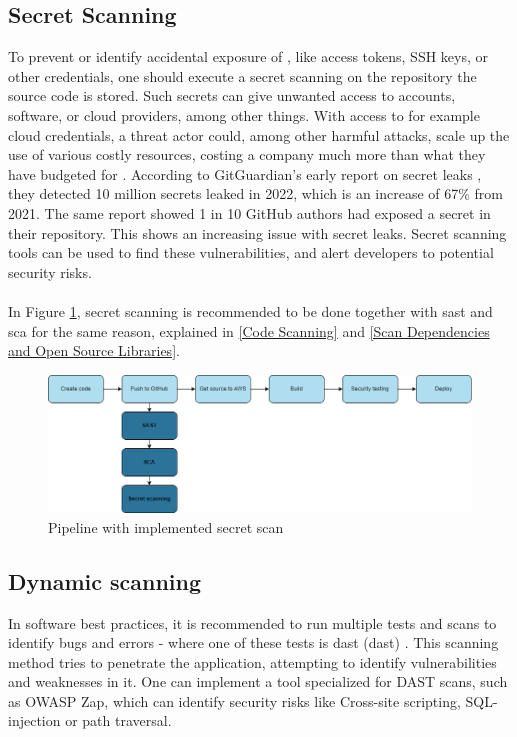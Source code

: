 \subsection{Secret Scanning}
To prevent or identify accidental exposure of , like access tokens, SSH keys, or other credentials, one should execute a secret scanning on the repository the source code is stored. Such secrets can give unwanted access to accounts, software, or cloud providers, among other things. With access to for example cloud credentials, a threat actor could, among other harmful attacks, scale up the use of various costly resources, costing a company much more than what they have budgeted for \cite{GitGuardianexploitexample}. According to GitGuardian's early report on secret leaks \cite{GitGuardiansecretsprawl}, they detected 10 million secrets leaked in 2022, which is an increase of 67\% from 2021. The same report showed 1 in 10 GitHub authors had exposed a secret in their repository. This shows an increasing issue with secret leaks. Secret scanning tools can be used to find these vulnerabilities, and alert developers to potential security risks. \cite{GithubSecretScanning} 
\\~\\
In Figure \ref{fig: Pipeline with implemented secret scan}, secret scanning is recommended to be done together with \acrshort{sast} and \acrshort{sca} for the same reason, explained in \ref{Code Scanning} and \ref{Scan Dependencies and Open Source Libraries}.

\vspace{2mm}
\begin{figure}[H]
    \centering
    \includegraphics[width=0.8\columnwidth]{Images/pipeline4.png}
    \caption{Pipeline with implemented secret scan}
    \label{fig: Pipeline with implemented secret scan}
\end{figure}

\subsection{Dynamic scanning}
In software best practices, it is recommended to run multiple tests and scans to identify bugs and errors - where one of these tests is \acrlong{dast} (\acrshort{dast}) \cite{bestpracticeSupplyChain}. This scanning method tries to penetrate the application, attempting to identify vulnerabilities and weaknesses in it. One can implement a tool specialized for DAST scans, such as OWASP Zap, which can identify security risks like \gls{Cross-site scripting}, \gls{SQL-injection} or path traversal.\cite{dynamictesting}


